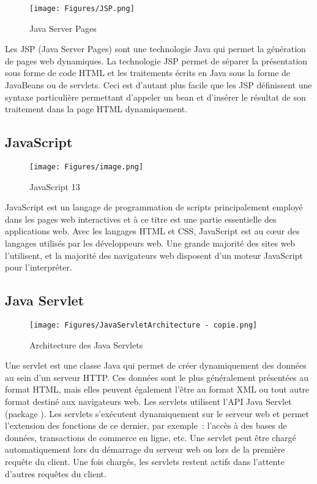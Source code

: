 \begin{figure}[H]
    \centering
    \texttt{[image: Figures/JSP.png]}
    \caption{Java Server Pages}
\end{figure}


Les JSP (Java Server Pages) sont une technologie Java qui permet la génération de pages web dynamiques. La technologie JSP permet de séparer la présentation sous forme de code HTML et les traitements écrits en Java sous la forme de JavaBeans ou de servlets. Ceci est d'autant plus facile que les JSP définissent une syntaxe particulière permettant d'appeler un bean et d'insérer le résultat de son traitement dans la page HTML dynamiquement.

\vspace{.5cm}
\subsection{JavaScript}
\vspace{.5cm}

\begin{figure}[H]
    \centering
    \texttt{[image: Figures/image.png]}
    \caption{JavaScript 13}
\end{figure}

JavaScript est un langage de programmation de scripts principalement employé dans les pages web interactives et à ce titre est une partie essentielle des applications web. Avec les langages HTML et CSS, JavaScript est au cœur des langages utilisés par les développeurs web. Une grande majorité des sites web l'utilisent, et la majorité des navigateurs web disposent d'un moteur JavaScript pour l'interpréter.


\vspace{.5cm}
\subsection{Java Servlet}
\vspace{.5cm}

\begin{figure}[H]
    \centering
    \texttt{[image: Figures/JavaServletArchitecture - copie.png]}
    \caption{Architecture des Java Servlets}
\end{figure}


Une servlet est une classe Java qui permet de créer dynamiquement des données au sein d'un serveur HTTP. Ces données sont le plus généralement présentées au format HTML, mais elles peuvent également l'être au format XML ou tout autre format destiné aux navigateurs web. Les servlets utilisent l'API Java Servlet (package {}). Les servlets s'exécutent dynamiquement sur le serveur web et permet l'extension des fonctions de ce dernier, par exemple : l'accès à des bases de données, transactions de commerce en ligne, etc. Une servlet peut être chargé automatiquement lors du démarrage du serveur web ou lors de la première requête du client. Une fois chargés, les servlets restent actifs dans l'attente d'autres requêtes du client.



